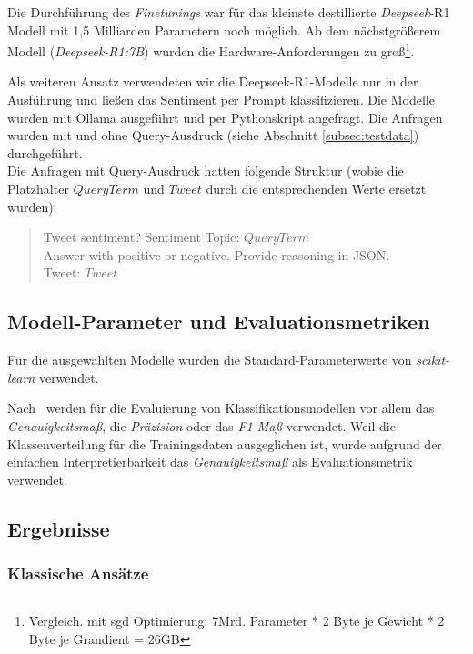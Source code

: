 Die Durchführung des \textit{Finetunings} war für das kleinste destillierte \textit{Deepseek}-R1 Modell mit 1,5 Milliarden Parametern noch möglich.
Ab dem nächstgrößerem Modell (\textit{Deepseek-R1:7B}) wurden die Hardware-Anforderungen zu groß\footnote{Vergleich. mit \gls{sgd} Optimierung: 7Mrd. Parameter * 2 Byte je Gewicht * 2 Byte je Grandient = 26GB}.

Als weiteren Ansatz verwendeten wir die Deepseek-R1-Modelle nur in der Ausführung und ließen das Sentiment per Prompt klassifizieren.
Die Modelle wurden mit Ollama ausgeführt und per Pythonskript angefragt.
Die Anfragen wurden mit und ohne Query-Ausdruck (siehe Abschnitt \ref{subsec:testdata}) durchgeführt.\\
Die Anfragen mit Query-Ausdruck hatten folgende Struktur (wobie die Platzhalter $QueryTerm$ und $Tweet$ durch die entsprechenden Werte ersetzt wurden):
\begin{quote}
    Tweet sentiment? Sentiment Topic: $QueryTerm$\\
    Answer with positive or negative. Provide reasoning in JSON.\\
    Tweet: $Tweet$
\end{quote}

\subsection{Modell-Parameter und Evaluationsmetriken}

Für die ausgewählten Modelle wurden die Standard-Parameterwerte von \textit{scikit-learn} verwendet.

Nach~\cite{wankhade2022survey} werden für die Evaluierung von Klassifikationsmodellen vor allem das \textit{Genauig\-keits\-maß}, die \textit{Präzision} oder das \textit{F1-Maß} verwendet.
Weil die Klassenverteilung für die Trainingsdaten ausgeglichen ist, wurde aufgrund der einfachen Interpretierbarkeit das \textit{Genauigkeitsmaß} als Evaluationsmetrik verwendet.

\subsection{Ergebnisse}

\subsubsection{Klassische Ansätze}

